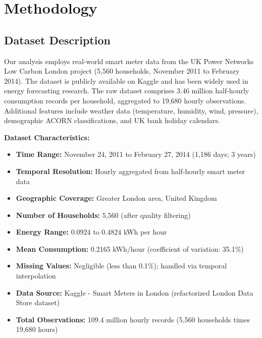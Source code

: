 \documentclass[11pt, a4paper, oneside]{article}
\begin{document}
\tableofcontents

\newpage








\section{Methodology}
\label{sec:methodology}

\subsection{Dataset Description}

Our analysis employs real-world smart meter data from the UK Power Networks Low Carbon London project (5,560 households, November 2011 to February 2014). The dataset is publicly available on Kaggle and has been widely used in energy forecasting research. The raw dataset comprises 3.46 million half-hourly consumption records per household, aggregated to 19,680 hourly observations. Additional features include weather data (temperature, humidity, wind, pressure), demographic ACORN classifications, and UK bank holiday calendars. 

\textbf{Dataset Characteristics:}
\begin{itemize}
    \item \textbf{Time Range:} November 24, 2011 to February 27, 2014 (1,186 days; 3 years)
    \item \textbf{Temporal Resolution:} Hourly aggregated from half-hourly smart meter data
    \item \textbf{Geographic Coverage:} Greater London area, United Kingdom
    \item \textbf{Number of Households:} 5,560 (after quality filtering)
    \item \textbf{Energy Range:} 0.0924 to 0.4824 kWh per hour
    \item \textbf{Mean Consumption:} 0.2165 kWh/hour (coefficient of variation: 35.1\%)
    \item \textbf{Missing Values:} Negligible (less than 0.1\%); handled via temporal interpolation
    \item \textbf{Data Source:} Kaggle - Smart Meters in London (refactorized London Data Store dataset)
    \item \textbf{Total Observations:} 109.4 million hourly records (5,560 households times 19,680 hours)
\end{itemize}
\end{document}
